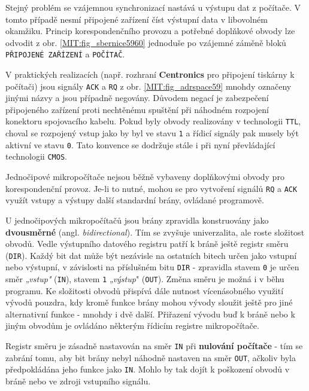       Stejný problém se vzájemnou synchronizací nastává u výstupu dat z počítače. V tomto případě 
      nesmí připojené zařízení číst výstupní data v libovolném okamžiku. Princip korespondenčního 
      provozu a potřebné doplňkové obvody lze odvodit z obr. \ref{MIT:fig_sbernice5960} jednoduše 
      po vzájemné záměně bloků \texttt{PŘIPOJENÉ ZAŘÍZENÍ} a \texttt{POČÍTAČ}.
      
      V praktických realizacích (např. rozhraní \textbf{Centronics} pro připojení tiskárny k
      počítači) jsou signály \texttt{ACK} a \texttt{RQ} z obr. \ref{MIT:fig_adrspace59} mnohdy
      označeny jinými názvy a jsou případně negovány. Důvodem negací je zabezpečení připojeného
      zařízení proti nechtěnému spuštění při náhodném rozpojení konektoru spojovacího kabelu. Pokud
      byly obvody realizovány v technologii \texttt{TTL}, choval se rozpojený vstup jako by byl ve
      stavu \texttt{1} a řídicí signály pak musely být aktivní ve stavu \texttt{0}. Tato konvence se
      dodržuje stále i při nyní převládající technologii \texttt{CMOS}.
      
      Jednočipové mikropočítače nejsou běžně vybaveny doplňkovými obvody pro korespondenční provoz. 
      Je-li to nutné, mohou se pro vytvoření signálů \texttt{RQ} a \texttt{ACK} využít vstupy a 
      výstupy další standardní brány, ovládané programově.
      
      U jednočipových mikropočítačů jsou brány zpravidla konstruovány jako \textbf{dvousměrné}
      (angl. \emph{bidirectional}). Tím se zvyšuje univerzalita, ale roste složitost obvodů. Vedle
      výstupního  datového registru patří k bráně ještě registr směru (\texttt{DIR}). Každý bit dat
      může být nezávisle na ostatních bitech určen jako vstupní nebo výstupní, v závislosti na
      příslušném bitu \texttt{DIR} - zpravidla stavem \texttt{0} je určen směr \emph{„vstup"}
      (\texttt{IN}), stavem \texttt{1} \emph{„výstup}" (\texttt{OUT}). Změna směru je možná i v běhu
      programu. Ke složitosti obvodů přispívá dále nutnost vícenásobného využití vývodů pouzdra, kdy
      kromě funkce brány mohou vývody sloužit ještě pro jiné alternativní funkce - mnohdy i dvě
      další. Přiřazení vývodu buď k bráně nebo k jiným obvodům je ovládáno některým řídicím registre
      mikropočítače.
      
      Registr směru je zásadně nastavován na směr \texttt{IN} při \textbf{nulování počítače} - tím 
      se zabrání tomu, aby bit brány nebyl náhodně nastaven na směr \texttt{OUT}, ačkoliv byla 
      předpokládána jeho funkce jako \texttt{IN}. Mohlo by tak dojít k poškození obvodů v bráně 
      nebo ve zdroji vstupního signálu.
      
